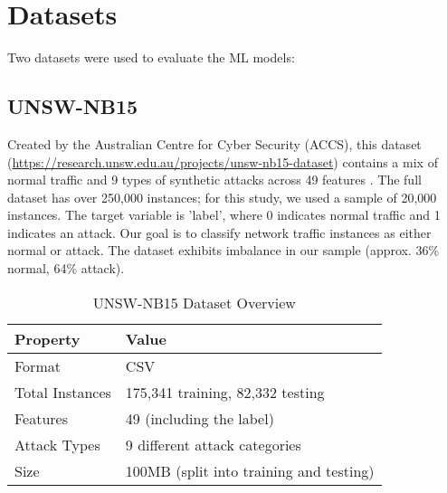 \documentclass[sigconf,screen,final,nonacm]{acmart}
\begin{document}
\vspace{1cm}
\section{Datasets}
Two datasets were used to evaluate the ML models:

\subsection{UNSW-NB15}
Created by the Australian Centre for Cyber Security (ACCS), this dataset (\url{https://research.unsw.edu.au/projects/unsw-nb15-dataset}) contains a mix of normal traffic and 9 types of synthetic attacks across 49 features \cite{10.1145/3658644.3691410}. The full dataset has over 250,000 instances; for this study, we used a sample of 20,000 instances. The target variable is 'label', where 0 indicates normal traffic and 1 indicates an attack. Our goal is to classify network traffic instances as either normal or attack. The dataset exhibits imbalance in our sample (approx. 36\% normal, 64\% attack).
\begin{table}[h]
\caption{UNSW-NB15 Dataset Overview}
\centering
\begin{tabular}{p{2.5cm}p{5cm}}
\toprule
\textbf{Property} & \textbf{Value} \\
\midrule
Format & CSV \\
Total Instances & 175,341 training, 82,332 testing \\
Features & 49 (including the label) \\
Attack Types & 9 different attack categories \\
Size & 100MB (split into training and testing) \\
\bottomrule
\end{tabular}
\end{table}
\end{document}
